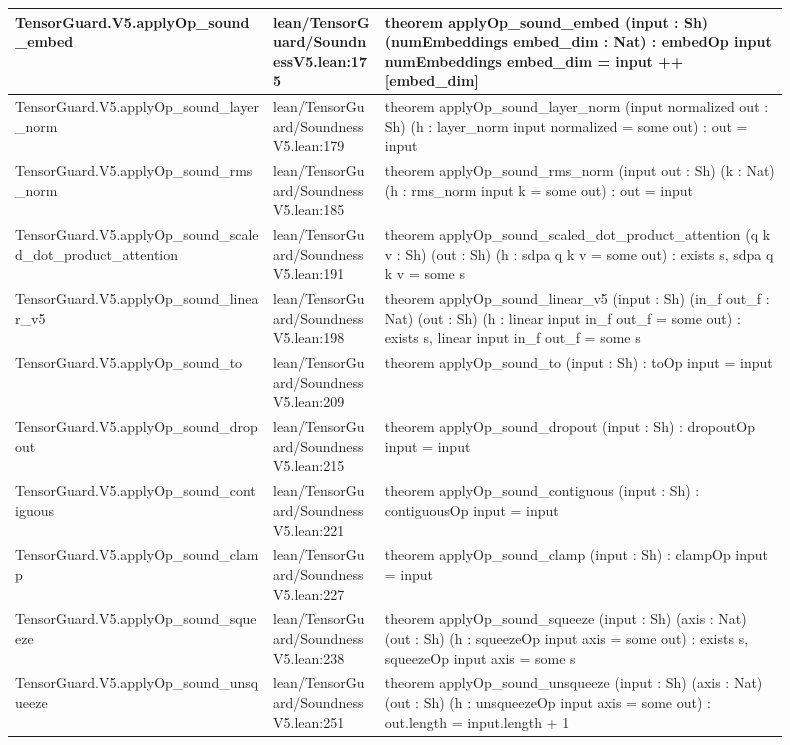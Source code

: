 \documentclass[10pt]{article}
\begin{document}
\begin{longtable}{|p{0.30\linewidth}|p{0.13\linewidth}|p{0.47\linewidth}|}
TensorGuard.V5.applyOp\_sound\_embed & lean/TensorGuard/SoundnessV5.lean:175 & theorem applyOp\_sound\_embed (input : Sh) (numEmbeddings embed\_dim : Nat) : embedOp input numEmbeddings embed\_dim = input ++ [embed\_dim] \\
\hline
TensorGuard.V5.applyOp\_sound\_layer\_norm & lean/TensorGuard/SoundnessV5.lean:179 & theorem applyOp\_sound\_layer\_norm (input normalized out : Sh) (h : layer\_norm input normalized = some out) : out = input \\
\hline
TensorGuard.V5.applyOp\_sound\_rms\_norm & lean/TensorGuard/SoundnessV5.lean:185 & theorem applyOp\_sound\_rms\_norm (input out : Sh) (k : Nat) (h : rms\_norm input k = some out) : out = input \\
\hline
TensorGuard.V5.applyOp\_sound\_scaled\_dot\_product\_attention & lean/TensorGuard/SoundnessV5.lean:191 & theorem applyOp\_sound\_scaled\_dot\_product\_attention (q k v : Sh) (out : Sh) (h : sdpa q k v = some out) : exists s, sdpa q k v = some s \\
\hline
TensorGuard.V5.applyOp\_sound\_linear\_v5 & lean/TensorGuard/SoundnessV5.lean:198 & theorem applyOp\_sound\_linear\_v5 (input : Sh) (in\_f out\_f : Nat) (out : Sh) (h : linear input in\_f out\_f = some out) : exists s, linear input in\_f out\_f = some s \\
\hline
TensorGuard.V5.applyOp\_sound\_to & lean/TensorGuard/SoundnessV5.lean:209 & theorem applyOp\_sound\_to (input : Sh) : toOp input = input \\
\hline
TensorGuard.V5.applyOp\_sound\_dropout & lean/TensorGuard/SoundnessV5.lean:215 & theorem applyOp\_sound\_dropout (input : Sh) : dropoutOp input = input \\
\hline
TensorGuard.V5.applyOp\_sound\_contiguous & lean/TensorGuard/SoundnessV5.lean:221 & theorem applyOp\_sound\_contiguous (input : Sh) : contiguousOp input = input \\
\hline
TensorGuard.V5.applyOp\_sound\_clamp & lean/TensorGuard/SoundnessV5.lean:227 & theorem applyOp\_sound\_clamp (input : Sh) : clampOp input = input \\
\hline
TensorGuard.V5.applyOp\_sound\_squeeze & lean/TensorGuard/SoundnessV5.lean:238 & theorem applyOp\_sound\_squeeze (input : Sh) (axis : Nat) (out : Sh) (h : squeezeOp input axis = some out) : exists s, squeezeOp input axis = some s \\
\hline
TensorGuard.V5.applyOp\_sound\_unsqueeze & lean/TensorGuard/SoundnessV5.lean:251 & theorem applyOp\_sound\_unsqueeze (input : Sh) (axis : Nat) (out : Sh) (h : unsqueezeOp input axis = some out) : out.length = input.length + 1 \\

\end{longtable}
\end{document}
